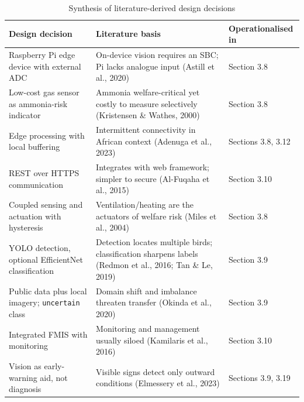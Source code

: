 \documentclass[12pt,a4paper]{report}
\begin{document}
\begin{table}[tbp]
\caption{Synthesis of literature-derived design decisions}
\label{tab:litdesign}
\centering
\small
\begin{tabularx}{\textwidth}{|X|X|l|}
\hline
\rowcolor{headerblue}
\textbf{Design decision} & \textbf{Literature basis} & \textbf{Operationalised in} \\
\hline
Raspberry Pi edge device with external ADC & On-device vision requires an SBC; Pi lacks analogue input (Astill et al., 2020) & Section 3.8 \\
\hline
Low-cost gas sensor as ammonia-risk indicator & Ammonia welfare-critical yet costly to measure selectively (Kristensen \& Wathes, 2000) & Section 3.8 \\
\hline
Edge processing with local buffering & Intermittent connectivity in African context (Adenuga et al., 2023) & Sections 3.8, 3.12 \\
\hline
REST over HTTPS communication & Integrates with web framework; simpler to secure (Al-Fuqaha et al., 2015) & Section 3.10 \\
\hline
Coupled sensing and actuation with hysteresis & Ventilation/heating are the actuators of welfare risk (Miles et al., 2004) & Section 3.8 \\
\hline
YOLO detection, optional EfficientNet classification & Detection locates multiple birds; classification sharpens labels (Redmon et al., 2016; Tan \& Le, 2019) & Section 3.9 \\
\hline
Public data plus local imagery; \texttt{uncertain} class & Domain shift and imbalance threaten transfer (Okinda et al., 2020) & Section 3.9 \\
\hline
Integrated FMIS with monitoring & Monitoring and management usually siloed (Kamilaris et al., 2016) & Section 3.10 \\
\hline
Vision as early-warning aid, not diagnosis & Visible signs detect only outward conditions (Elmessery et al., 2023) & Sections 3.9, 3.19 \\
\hline
\end{tabularx}
\end{table}
\end{document}
